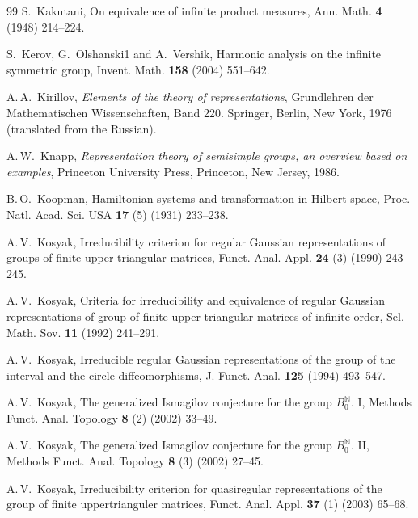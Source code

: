 \documentclass[preprint,12pt]{elsarticle}
\numberwithin{equation}{section}
\begin{document}
\begin{thebibliography}{99}
 S.~Kakutani, On equivalence of infinite product measures,  Ann. Math. {\bf 4} (1948) 214--224. 

 


S.~Kerov, G.~Olshanski1 and A.~Vershik, Harmonic analysis on the infinite symmetric group,
Invent. Math. {\bf 158} (2004) 551--642. 



 A.\,A.~Kirillov,  {\it Elements of the theory of
representations}, Grundlehren der Mathematischen Wissenschaften,
Band 220. Springer, Berlin, New York, 1976 (translated from the
Russian).

 A.\,W.~Knapp, {\it Representation theory of semisimple groups, an overview based on examples}, Princeton University Press, Princeton, New Jersey,
1986. 


 B.\,O.~Koopman,  Hamiltonian systems and transformation in Hilbert space, Proc. Natl. Acad. Sci. USA {\bf 17} (5) (1931) 233--238.




 A.\,V.~Kosyak, Irreducibility criterion for regular Gaussian representations of groups of finite upper triangular matrices, 
Funct. Anal. Appl. {\bf 24} (3) (1990) 243--245. 


 A.\,V.~Kosyak, Criteria for irreducibility and equivalence of regular Gaussian representations of group of finite upper triangular matrices of infinite 
order, Sel. Math. Sov. {\bf 11} (1992) 241--291. 



 A.\,V.~Kosyak,  Irreducible regular Gaussian representations of the group of the interval and the circle diffeomorphisms, 
J. Funct. Anal. {\bf 125} (1994) 493--547. 



 A.\,V.~Kosyak, The generalized Ismagilov conjecture
for the group $B_0^{\mathbb N}$. I, Methods Funct. Anal. Topology
{\bf 8} (2)  (2002)  33--49. 


 A.\,V.~Kosyak, The generalized Ismagilov conjecture
for the group $B_0^{\mathbb N}$. II, Methods Funct. Anal. Topology {\bf 8} (3) (2002) 27--45. 



 A.\,V.~Kosyak,
Irreducibility criterion for quasiregular representations of the group of finite uppertrianguler matrices, Funct. Anal. Appl. {\bf 37} (1) (2003)
65--68. 



\end{thebibliography}
\end{document}
